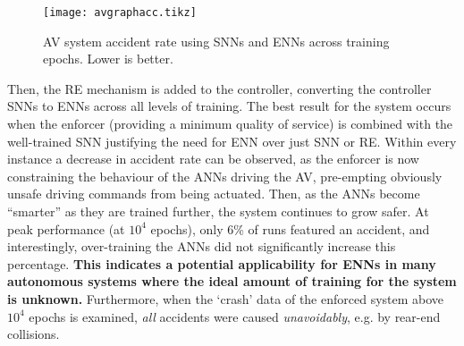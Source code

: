 \begin{figure}[H]
	\centering
	\texttt{[image: avgraphacc.tikz]}
	\caption{\ac{AV} system accident rate using \acp{SNN} and \acp{ENN} across training epochs. Lower is better. \label{fig:avaccidents}}
	\vspace{-4mm}
\end{figure}
Then, the \ac{RE} mechanism is added to the controller, converting the
controller \acp{SNN} to \acp{ENN} across all levels of training.
The best result for the system occurs when the enforcer (providing a
minimum quality of service) is combined with the well-trained \ac{SNN}
justifying the need for \ac{ENN} over just \ac{SNN} or \ac{RE}.
Within every instance a decrease in accident rate can be observed, as the enforcer is now constraining the behaviour of the \acp{ANN} driving the \ac{AV}, pre-empting obviously unsafe driving commands from being actuated.
Then, as the \acp{ANN} become ``smarter'' as they are trained further, the system continues to grow safer. 
At peak performance (at $10^4$ epochs), only 6\% of runs featured an accident, and interestingly, over-training the \acp{ANN} did not significantly increase this percentage.
\textbf{This indicates a potential applicability for \acp{ENN} in many autonomous systems where the ideal amount of training for the system is unknown.}
Furthermore, when the `crash' data of the enforced system above $10^4$ epochs is examined, \emph{all} accidents were caused \emph{unavoidably}, e.g. by rear-end collisions.









